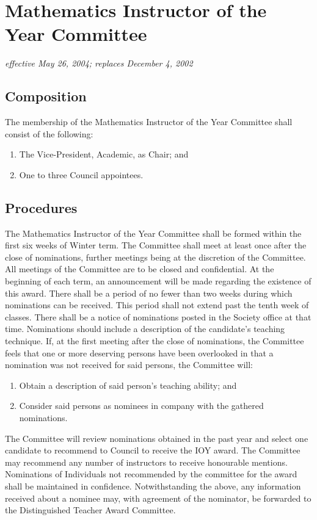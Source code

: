 \section{Mathematics Instructor of the Year Committee}
\emph{effective May 26, 2004; replaces December 4, 2002}\\

\subsection{Composition}
The membership of the Mathematics Instructor of the Year Committee shall consist of the following:
\begin{enumerate}
\item The Vice-President, Academic, as Chair; and
\item One to three Council appointees.
\end{enumerate}


\subsection{Procedures}
The Mathematics Instructor of the Year Committee shall be formed within the first six weeks of Winter term. The Committee shall meet at least once after the close of nominations, further meetings being at the discretion of the Committee. All meetings of the Committee are to be closed and confidential.
At the beginning of each term, an announcement will be made regarding the existence of this award.
There shall be a period of no fewer than two weeks during which nominations can be received. This period shall not extend past the tenth week of classes. There shall be a notice of nominations posted in the Society office at that time. Nominations should include a description of the candidate's teaching technique.
If, at the first meeting after the close of nominations, the Committee feels that one or more deserving persons have been overlooked in that a nomination was not received for said persons, the Committee will:
\begin{enumerate}
\item Obtain a description of said person’s teaching ability; and
\item Consider said persons as nominees in company with the gathered nominations.
\end{enumerate}
The Committee will review nominations obtained in the past year and select one candidate to recommend to Council to receive the IOY award. The Committee may recommend any number of instructors to receive honourable mentions.
Nominations of Individuals not recommended by the committee for the award shall be maintained in confidence.
Notwithstanding the above, any information received about a nominee may, with agreement of the nominator, be forwarded to the Distinguished Teacher Award Committee.

